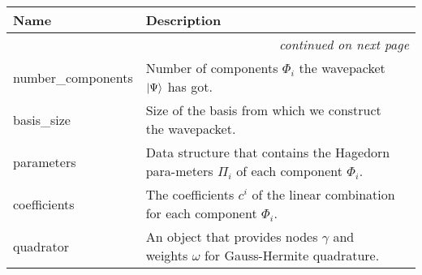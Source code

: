     \vspace{-1cm}
\hspace{\varindent}\begin{longtable}{|p{\varnamewidth}|p{\vardescrwidth}|l}
\cline{1-2}
\cline{1-2} \centering \textbf{Name} & \centering \textbf{Description}& \\
\cline{1-2}
\endhead\cline{1-2}\multicolumn{3}{r}{\small\textit{continued on next page}}\\\endfoot\cline{1-2}
\endlastfoot\raggedright n\-u\-m\-b\-e\-r\-\_\-c\-o\-m\-p\-o\-n\-e\-n\-t\-s\- & Number of components $\Phi_i$ the wavepacket
          $\Ket{\Psi}$ has got.&\\
\cline{1-2}
\raggedright b\-a\-s\-i\-s\-\_\-s\-i\-z\-e\- & Size of the basis from which we construct the wavepacket.&\\
\cline{1-2}
\raggedright p\-a\-r\-a\-m\-e\-t\-e\-r\-s\- & Data structure that contains the Hagedorn para-meters
          $\Pi_i$ of each component
          $\Phi_i$.&\\
\cline{1-2}
\raggedright c\-o\-e\-f\-f\-i\-c\-i\-e\-n\-t\-s\- & The coefficients $c^i$ of the linear
          combination for each component $\Phi_i$.&\\
\cline{1-2}
\raggedright q\-u\-a\-d\-r\-a\-t\-o\-r\- & An object that provides nodes $\gamma$ and
          weights $\omega$ for Gauss-Hermite quadrature.&\\
\cline{1-2}
\end{longtable}

